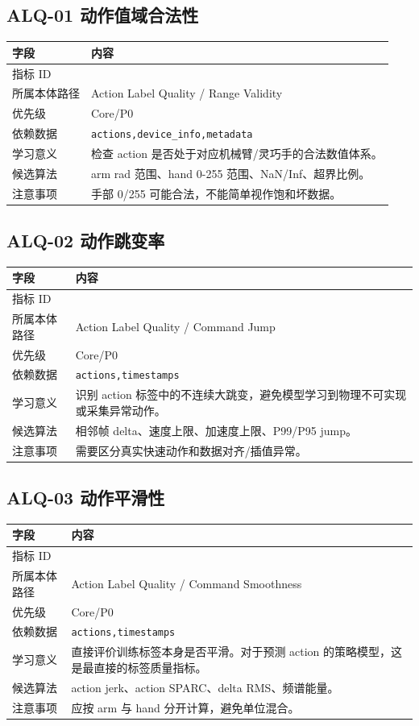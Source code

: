 \documentclass[UTF8,zihao=-4]{ctexart}
\newcommand{\Code}[1]{\texttt{#1}}
\newcommand{\MID}[1]{\texttt{\seqsplit{#1}}}
\begin{document}
\subsection{ALQ-01 动作值域合法性}

\begin{longtable}{L{3.6cm} L{9.6cm}}
\toprule
字段 & 内容 \\
\midrule
指标 ID & \MID{ALQ-01} \\
所属本体路径 & Action Label Quality / Range Validity \\
优先级 & Core/P0 \\
依赖数据 & \Code{actions,device\_info,metadata} \\
学习意义 & 检查 action 是否处于对应机械臂/灵巧手的合法数值体系。 \\
候选算法 & arm rad 范围、hand 0-255 范围、NaN/Inf、超界比例。 \\
注意事项 & 手部 0/255 可能合法，不能简单视作饱和坏数据。 \\
\bottomrule
\end{longtable}

\subsection{ALQ-02 动作跳变率}

\begin{longtable}{L{3.6cm} L{9.6cm}}
\toprule
字段 & 内容 \\
\midrule
指标 ID & \MID{ALQ-02} \\
所属本体路径 & Action Label Quality / Command Jump \\
优先级 & Core/P0 \\
依赖数据 & \Code{actions,timestamps} \\
学习意义 & 识别 action 标签中的不连续大跳变，避免模型学习到物理不可实现或采集异常动作。 \\
候选算法 & 相邻帧 delta、速度上限、加速度上限、P99/P95 jump。 \\
注意事项 & 需要区分真实快速动作和数据对齐/插值异常。 \\
\bottomrule
\end{longtable}

\subsection{ALQ-03 动作平滑性}

\begin{longtable}{L{3.6cm} L{9.6cm}}
\toprule
字段 & 内容 \\
\midrule
指标 ID & \MID{ALQ-03} \\
所属本体路径 & Action Label Quality / Command Smoothness \\
优先级 & Core/P0 \\
依赖数据 & \Code{actions,timestamps} \\
学习意义 & 直接评价训练标签本身是否平滑。对于预测 action 的策略模型，这是最直接的标签质量指标。 \\
候选算法 & action jerk、action SPARC、delta RMS、频谱能量。 \\
注意事项 & 应按 arm 与 hand 分开计算，避免单位混合。 \\
\bottomrule
\end{longtable}
\end{document}
